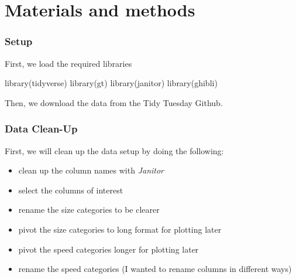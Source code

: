 \documentclass[
  10pt,
  letterpaper,
]{article}
\newenvironment{Shaded}{\begin{snugshade}}{\end{snugshade}}
\newcommand{\FunctionTok}[1]{\textcolor[rgb]{0.28,0.35,0.67}{#1}}
\newcommand{\NormalTok}[1]{\textcolor[rgb]{0.00,0.23,0.31}{#1}}
\newcommand{\OtherTok}[1]{\textcolor[rgb]{0.00,0.23,0.31}{#1}}
\newcommand{\SpecialCharTok}[1]{\textcolor[rgb]{0.37,0.37,0.37}{#1}}
\newcommand{\StringTok}[1]{\textcolor[rgb]{0.13,0.47,0.30}{#1}}
\begin{document}
\section{Materials and methods}\label{materials-and-methods}

\subsubsection{Setup}\label{setup}

First, we load the required libraries

\begin{Shaded}
\begin{Highlighting}[]
\FunctionTok{library}\NormalTok{(tidyverse)}
\FunctionTok{library}\NormalTok{(gt)}
\FunctionTok{library}\NormalTok{(janitor)}
\FunctionTok{library}\NormalTok{(ghibli)}
\end{Highlighting}
\end{Shaded}

Then, we download the data from the Tidy Tuesday Github.

\begin{Shaded}
\end{Shaded}

\subsubsection{Data Clean-Up}\label{data-clean-up}

First, we will clean up the data setup by doing the following:

\begin{itemize}
\item
  clean up the column names with \emph{Janitor}
\item
  select the columns of interest
\item
  rename the size categories to be clearer
\item
  pivot the size categories to long format for plotting later
\item
  pivot the speed categories longer for plotting later
\item
  rename the speed categories (I wanted to rename columns in different
  ways)
\end{itemize}
\end{document}
